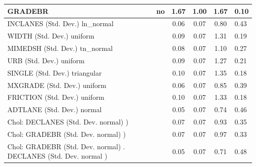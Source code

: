 \begin{table}
\begin{center}
\begin{tabular}{|l|l|c|c|c|l|}
			GRADEBR & no & 1.67 & 1.00 & 1.67 & 0.10 \\
			\hline
			INCLANES (Std. Dev.) ln_normal &  & 0.06 & 0.07 & 0.80 & 0.43 \\
			\hline
			WIDTH (Std. Dev.) uniform &  & 0.09 & 0.07 & 1.31 & 0.19 \\
			\hline
			MIMEDSH (Std. Dev.) tn_normal &  & 0.08 & 0.07 & 1.10 & 0.27 \\
			\hline
			URB (Std. Dev.) uniform &  & 0.09 & 0.07 & 1.27 & 0.21 \\
			\hline
			SINGLE (Std. Dev.) triangular &  & 0.10 & 0.07 & 1.35 & 0.18 \\
			\hline
			MXGRADE (Std. Dev.) uniform &  & 0.06 & 0.07 & 0.85 & 0.39 \\
			\hline
			FRICTION (Std. Dev.) uniform &  & 0.10 & 0.07 & 1.33 & 0.18 \\
			\hline
			ADTLANE (Std. Dev.) normal &  & 0.05 & 0.07 & 0.74 & 0.46 \\
			\hline
			 Chol: DECLANES (Std. Dev. normal) ) &  & 0.07 & 0.07 & 0.93 & 0.35 \\
			\hline
			 Chol: GRADEBR (Std. Dev. normal) ) &  & 0.07 & 0.07 & 0.97 & 0.33 \\
			\hline
			 Chol: GRADEBR (Std. Dev. normal) . DECLANES (Std. Dev.   normal ) &  & 0.05 & 0.07 & 0.71 & 0.48 \\
			\hline
		\end{tabular}
	\end{center}
\end{table}